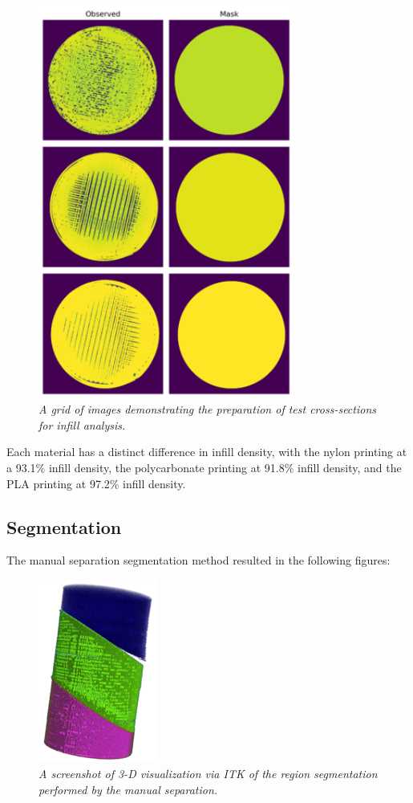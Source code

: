 \documentclass[11pt, letterpaper]{article}
\begin{document}
\begin{figure}[H]
    \centering
    \label{fig:mask-comparison}
    \includegraphics[width=0.75\textwidth]{mask_comparison.png}
    \caption{\emph{A grid of images demonstrating the preparation of test cross-sections for infill analysis.}}
\end{figure}

Each material has a distinct difference in infill density, with the nylon printing at a 93.1\% infill density, the polycarbonate printing at 91.8\% infill density, and the PLA printing at 97.2\% infill density.

\subsection{Segmentation}
The manual separation segmentation method resulted in the following figures:

\begin{figure}[H]
    \centering
    \includegraphics[width=0.35\textwidth]{ITK.png}
    \caption{\emph{A screenshot of 3-D visualization via ITK of the region segmentation performed by the manual separation.}}
\end{figure}
\end{document}
